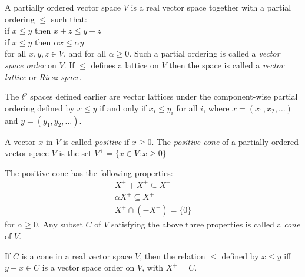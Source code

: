 \begin{defn}
A partially ordered vector space $V$ is a real vector space together with a partial ordering $\le$ such that:
\vspace{0.1cm}\\
\indent if $x \le y$ then $x + z \le y + z$\\
\indent if $x \le y$ then $\alpha x \le \alpha y$
\vspace{0.1cm}\\
for all $x,y,z \in V$, and for all $\alpha \ge 0$. Such a partial ordering is called a \emph{vector space order} on $V$. If $\le$ defines a lattice on $V$ then the space is called a \emph{vector lattice} or \emph{Riesz space}.

\begin{example}
The $l^p$ spaces defined earlier are vector lattices under the component-wise partial ordering defined by $x \le y$ if and only if $x_i \le y_i$ for all $i$, where $x = (x_1, x_2, \ldots)$ and $y = (y_1, y_2, \ldots)$.
\end{example}


A vector $x$ in $V$ is called \emph{positive} if $x \ge 0$. The \emph{positive cone} of a partially ordered vector space $V$ is the set $V^+ = \{x \in V : x \ge 0\}$
\end{defn}

The positive cone has the following properties:
\begin{eqnarray*}
X^+ + X^+ \subseteq X^+\\
\alpha X^+ \subseteq X^+\\
X^+ \cap (-X^+) = \{0\}
\end{eqnarray*}
for $\alpha \ge 0$. Any subset $C$ of $V$ satisfying the above three properties is called a \emph{cone} of $V$.

\begin{prop}
If $C$ is a cone in a real vector space $V$, then the relation $\le$ defined by $x \le y$ iff $y - x \in C$ is a vector space order on $V$, with $X^+ = C$.
\end{prop}

